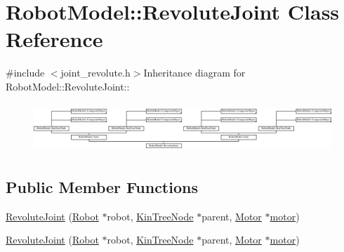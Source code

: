 \hypertarget{class_robot_model_1_1_revolute_joint}{
\section{RobotModel::RevoluteJoint Class Reference}
\label{class_robot_model_1_1_revolute_joint}
}


{\ttfamily \#include $<$joint\_\-revolute.h$>$}Inheritance diagram for RobotModel::RevoluteJoint::\begin{figure}[H]
\begin{center}
\leavevmode
\includegraphics[height=1.8617cm]{class_robot_model_1_1_revolute_joint}
\end{center}
\end{figure}
\subsection*{Public Member Functions}
\begin{DoxyCompactItemize}
\item 
\hyperlink{class_robot_model_1_1_revolute_joint_afa148418b3aeabb6294dcb8bdc033208}{RevoluteJoint} (\hyperlink{class_robot_model_1_1_robot}{Robot} $\ast$robot, \hyperlink{class_robot_model_1_1_kin_tree_node}{KinTreeNode} $\ast$parent, \hyperlink{class_robot_model_1_1_motor}{Motor} $\ast$\hyperlink{class_robot_model_1_1_joint_a8e8165df2271b16ab446028ee6bfa1c6}{motor})
\item 
\hyperlink{class_robot_model_1_1_revolute_joint_aecc7fa3eae25c360a903ff89e196b576}{RevoluteJoint} (\hyperlink{class_robot_model_1_1_robot}{Robot} $\ast$robot, \hyperlink{class_robot_model_1_1_kin_tree_node}{KinTreeNode} $\ast$parent, \hyperlink{class_robot_model_1_1_motor}{Motor} $\ast$\hyperlink{class_robot_model_1_1_joint_a8e8165df2271b16ab446028ee6bfa1c6}{motor})
\end{DoxyCompactItemize}


